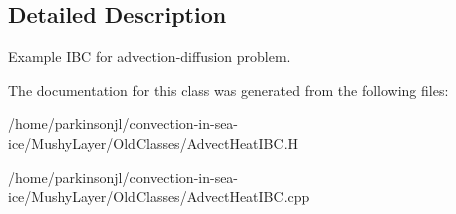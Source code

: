 \subsection{Detailed Description}
Example I\-B\-C for advection-\/diffusion problem. 

The documentation for this class was generated from the following files\-:\begin{DoxyCompactItemize}
\item 
/home/parkinsonjl/convection-\/in-\/sea-\/ice/\-Mushy\-Layer/\-Old\-Classes/Advect\-Heat\-I\-B\-C.\-H\item 
/home/parkinsonjl/convection-\/in-\/sea-\/ice/\-Mushy\-Layer/\-Old\-Classes/Advect\-Heat\-I\-B\-C.\-cpp\end{DoxyCompactItemize}
